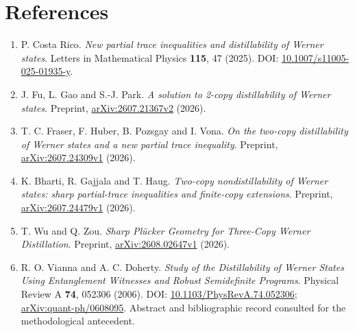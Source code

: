 \documentclass[
  11pt,
]{article}
\providecommand{\tightlist}{%
  \setlength{\itemsep}{0pt}\setlength{\parskip}{0pt}}
\begin{document}
\section{References}\label{references}

\begin{enumerate}
\def\labelenumi{\arabic{enumi}.}
\tightlist
\item
  P. Costa Rico. \emph{New partial trace inequalities and distillability
  of Werner states}. Letters in Mathematical Physics \textbf{115}, 47
  (2025). DOI:
  \href{https://doi.org/10.1007/s11005-025-01935-y}{10.1007/s11005-025-01935-y}.
\item
  J. Fu, L. Gao and S.-J. Park. \emph{A solution to 2-copy
  distillability of Werner states}. Preprint,
  \href{https://arxiv.org/abs/2607.21367v2}{arXiv:2607.21367v2} (2026).
\item
  T. C. Fraser, F. Huber, B. Pozsgay and I. Vona. \emph{On the two-copy
  distillability of Werner states and a new partial trace inequality}.
  Preprint,
  \href{https://arxiv.org/abs/2607.24309v1}{arXiv:2607.24309v1} (2026).
\item
  K. Bharti, R. Gajjala and T. Haug. \emph{Two-copy nondistillability of
  Werner states: sharp partial-trace inequalities and finite-copy
  extensions}. Preprint,
  \href{https://arxiv.org/abs/2607.24479v1}{arXiv:2607.24479v1} (2026).
\item
  T. Wu and Q. Zou. \emph{Sharp Plücker Geometry for Three-Copy Werner
  Distillation}. Preprint,
  \href{https://arxiv.org/abs/2608.02647v1}{arXiv:2608.02647v1} (2026).
\item
  R. O. Vianna and A. C. Doherty. \emph{Study of the Distillability of
  Werner States Using Entanglement Witnesses and Robust Semidefinite
  Programs}. Physical Review A \textbf{74}, 052306 (2006). DOI:
  \href{https://doi.org/10.1103/PhysRevA.74.052306}{10.1103/PhysRevA.74.052306};
  \href{https://arxiv.org/abs/quant-ph/0608095}{arXiv:quant-ph/0608095}.
  Abstract and bibliographic record consulted for the methodological
  antecedent.
\end{enumerate}
\end{document}
